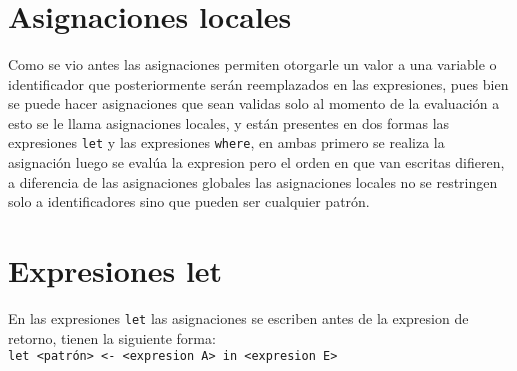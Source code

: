       \begin{fxcode}
         \\
          
      \end{fxcode}
      
      \begin{fxcode}
         \\
          
      \end{fxcode}
      
      \begin{fxcode}
         \\
         \\
         \\
      \end{fxcode}
      
   \section{Asignaciones locales}
      Como se vio antes las asignaciones permiten otorgarle un valor a una variable o identificador que posteriormente serán reemplazados en las expresiones, pues bien se puede hacer asignaciones que sean validas solo al momento de la evaluación a esto se le llama asignaciones locales, y están presentes en dos formas las expresiones \texttt{let} y las expresiones \texttt{where}, en ambas primero se realiza la asignación luego se evalúa la expresion pero el orden en que van escritas difieren, a diferencia de las asignaciones globales las asignaciones locales no se restringen solo a identificadores sino que pueden ser cualquier patrón.
      
   \section{Expresiones let}
      En las expresiones \texttt{let} las asignaciones se escriben antes de la expresion de retorno, tienen la siguiente forma:
      \\
      
      \texttt{let~<patrón>~<-~<expresion A>~in~<expresion E>}
      \\
      
